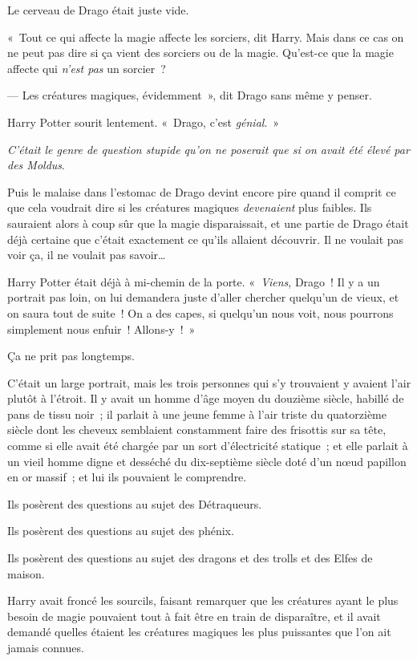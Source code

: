 Le cerveau de Drago était juste vide.

«~Tout ce qui affecte la magie affecte les sorciers, dit Harry. Mais dans ce cas on ne peut pas dire si ça vient des sorciers ou de la magie. Qu'est-ce que la magie affecte qui \emph{n'est pas} un sorcier~?

--- Les créatures magiques, évidemment~», dit Drago sans même y penser.

Harry Potter sourit lentement. «~Drago, c'est \emph{génial}.~»

\emph{C'était le genre de question stupide qu'on ne poserait que si on avait été élevé par des Moldus}.

Puis le malaise dans l'estomac de Drago devint encore pire quand il comprit ce que cela voudrait dire si les créatures magiques \emph{devenaient} plus faibles. Ils sauraient alors à coup sûr que la magie disparaissait, et une partie de Drago était déjà certaine que c'était exactement ce qu'ils allaient découvrir. Il ne voulait pas voir ça, il ne voulait pas savoir…

Harry Potter était déjà à mi-chemin de la porte. «~\emph{Viens}, Drago~! Il y a un portrait pas loin, on lui demandera juste d'aller chercher quelqu'un de vieux, et on saura tout de suite~! On a des capes, si quelqu'un nous voit, nous pourrons simplement nous enfuir~! Allons-y~!~»

\later

Ça ne prit pas longtemps.

C'était un large portrait, mais les trois personnes qui s'y trouvaient y avaient l'air plutôt à l'étroit. Il y avait un homme d'âge moyen du douzième siècle, habillé de pans de tissu noir~; il parlait à une jeune femme à l'air triste du quatorzième siècle dont les cheveux semblaient constamment faire des frisottis sur sa tête, comme si elle avait été chargée par un sort d'électricité statique~; et elle parlait à un vieil homme digne et desséché du dix-septième siècle doté d'un nœud papillon en or massif~; et lui ils pouvaient le comprendre.

Ils posèrent des questions au sujet des Détraqueurs.

Ils posèrent des questions au sujet des phénix.

Ils posèrent des questions au sujet des dragons et des trolls et des Elfes de maison.

Harry avait froncé les sourcils, faisant remarquer que les créatures ayant le plus besoin de magie pouvaient tout à fait être en train de disparaître, et il avait demandé quelles étaient les créatures magiques les plus puissantes que l'on ait jamais connues.

